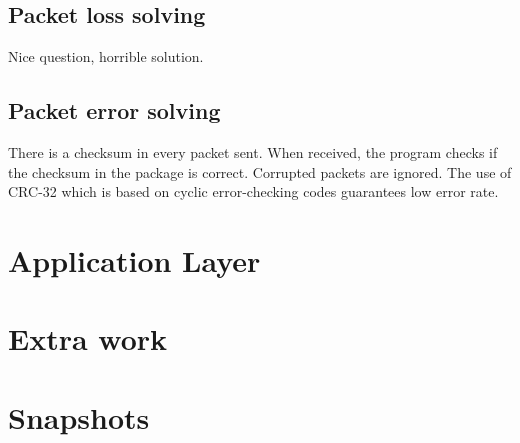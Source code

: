 \documentclass[10pt,a4paper]{article}
\begin{document}
    \subsection{Packet loss solving}
        Nice question, horrible solution.
    \subsection{Packet error solving}
        There is a checksum in every packet sent. When received, the program checks if the checksum in the package is correct. Corrupted packets are ignored. The use of CRC-32 which is based on cyclic error-checking codes guarantees low error rate.

\section{Application Layer}
\section{Extra work}
\section{Snapshots}
\end{document}
